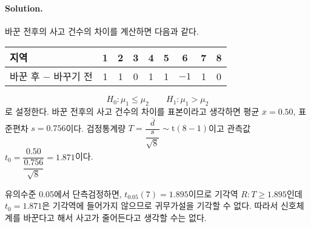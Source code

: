 \paragraph{Solution.} 바꾼 전후의 사고 건수의 차이를 계산하면 다음과 같다.
\begin{center}
    \begin{tabular}{l|cccccccc}
        \hline
        지역 & 1 & 2 & 3 & 4 & 5 & 6 & 7 & 8 \\
        \hline
        바꾼 후 $-$ 바꾸기 전 & 1 & 1 & 0 & 1 & 1 & $-1$ & 1 & 0 \\
        \hline
    \end{tabular}
\end{center}

\[H_0:\mu_1\leq\mu_2 \qquad H_1:\mu_1>\mu_2\]
로 설정한다. 바꾼 전후의 사고 건수의 차이를 표본이라고 생각하면 평균 $\overline{x}=0.50$, 표준편차 $s=0.756$이다.
검정통계량 $T=\dfrac{\overline{d}}{\dfrac{s}{\sqrt{8}}}\sim \mathrm{t}\left(8-1\right)$이고
관측값 $t_0=\dfrac{0.50}{\dfrac{0.756}{\sqrt{8}}}=1.871$이다.

유의수준 0.05에서 단측검정하면, $t_{0.05}\left(7\right)=1.895$이므로 기각역 $R:T\geq 1.895$인데
$t_0=1.871$은 기각역에 들어가지 않으므로 귀무가설을 기각할 수 없다. 따라서 신호체계를 바꾼다고 해서 사고가 줄어든다고 생각할 수는 없다.